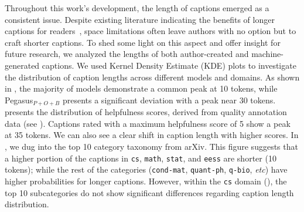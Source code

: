 Throughout this work's development, the length of captions emerged as a consistent issue.
Despite existing literature indicating the benefits of longer captions for readers~\cite{hartley2003single,gelman2002let}, space limitations often leave authors with no option but to craft shorter captions.
To shed some light on this aspect and offer insight for future research, we analyzed the lengths of both author-created and machine-generated captions.
We used Kernel Density Estimate (KDE) plots to investigate the distribution of caption lengths across different models and domains.
As shown in , the majority of models demonstrate a common peak at 10 tokens, while
Pegasus$_{P+O+B}$ presents a significant deviation with a peak near 30 tokens.
%
 presents the distribution of helpfulness scores, 
derived from quality annotation data (see ).
Captions rated with a maximum helpfulness score of 5 show a peak at 35 tokens.
We can also see a clear shift in caption length with higher scores.
%
In , we dug into the top 10 category taxonomy from arXiv.
This figure suggests that a higher portion of the captions in \texttt{cs}, \texttt{math}, \texttt{stat}, and \texttt{eess} are shorter (10 tokens); while the rest of the categories (\texttt{cond-mat}, \texttt{quant-ph}, \texttt{q-bio}, \emph{etc}) 
have higher probabilities for longer captions.
%
%
However, within the \texttt{cs} domain (), the top 10 subcategories do not show significant differences regarding caption length distribution.
